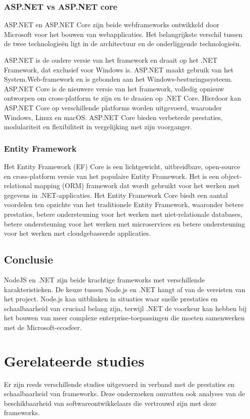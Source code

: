 \subsubsection*{ASP.NET vs ASP.NET core}%
ASP.NET en ASP.NET Core zijn beide webframeworks ontwikkeld door Microsoft voor het bouwen van webapplicaties. Het belangrijkste verschil tussen de twee technologieën ligt in de architectuur en de onderliggende technologieën.

ASP.NET is de oudere versie van het framework en draait op het .NET Framework,
dat exclusief voor Windows is. ASP.NET maakt gebruik van het
System.Web-framework en is gebonden aan het Windows-besturingssysteem.
\smallbreak ASP.NET Core is de nieuwere versie van het framework, volledig
opnieuw ontworpen om cross-platform te zijn en te draaien op .NET Core.
Hierdoor kan ASP.NET Core op verschillende platforms worden uitgevoerd,
waaronder Windows, Linux en macOS. ASP.NET Core bieden verbeterde prestaties,
modulariteit en flexibiliteit in vergelijking met zijn voorganger.

\subsubsection*{Entity Framework}%
Het Entity Framework (EF) Core is een lichtgewicht, uitbreidbare, open-source en cross-platform versie van het populaire Entity Framework. Het is een object-relational mapping (ORM) framework dat wordt gebruikt voor het werken met gegevens in .NET-applicaties. Het Entity Framework Core biedt een aantal voordelen ten opzichte van het traditionele Entity Framework, waaronder betere prestaties, betere ondersteuning voor het werken met niet-relationale databases, betere ondersteuning voor het werken met microservices en betere ondersteuning voor het werken met cloudgebaseerde applicaties.\autocite{Microsoft2024}

\subsection*{Conclusie}%
NodeJS en .NET zijn beide krachtige frameworks met verschillende
karakteristieken. De keuze tussen Node.js en .NET hangt af van de vereisten van
het project. Node.js kan uitblinken in situaties waar snelle prestaties en
schaalbaarheid van cruciaal belang zijn, terwijl .NET de voorkeur kan hebben
bij het bouwen van meer complexe enterprise-toepassingen die moeten samenwerken
met de Microsoft-ecosfeer.\autocite{Hutsulyak2023}

\section*{Ge\-rel\-at\-eerde studies}%
Er zijn reeds verschillende studies uitgevoerd in verband met de pre\-sta\-ties en schaalbaarheid van frameworks\autocite{Daityari2023}.  Deze onderzoeken omvatten ook analyses van de beschikbaarheid van soft\-ware\-ont\-wik\-kel\-aars die vertrouwd zijn met deze frameworks.

